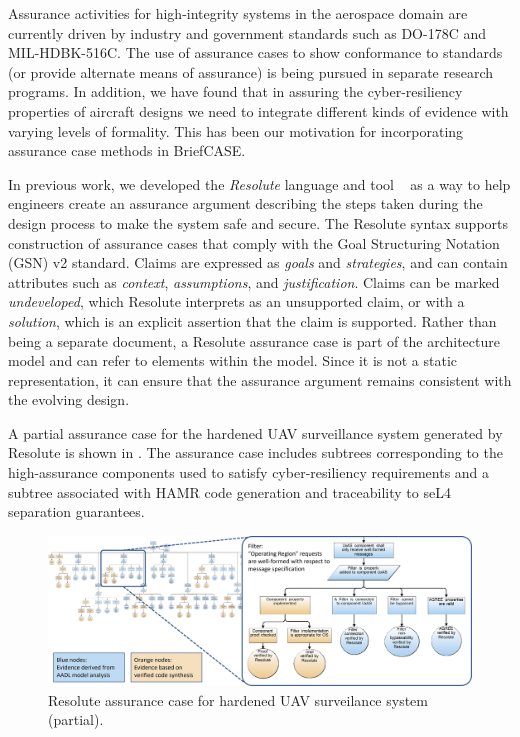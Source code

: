 Assurance activities for high-integrity systems in the aerospace domain are currently driven 
by industry and government standards such as DO-178C and MIL-HDBK-516C.  The use of assurance 
cases to show conformance to standards (or provide alternate means of assurance) is being pursued 
in separate research programs.  
In addition, we have found that in assuring the cyber-resiliency properties of aircraft designs we need to integrate
different kinds of evidence with varying levels of formality. This has been our motivation
for incorporating assurance case methods in BriefCASE.

In previous work, we developed the {\em Resolute} language and tool
~\cite{resolute-destion} as a way to help engineers create an assurance
argument describing the steps taken during the design process to make the system safe and secure.
The Resolute syntax supports construction of assurance cases that comply with the Goal Structuring
Notation (GSN) v2 standard.
Claims are expressed as \textit{goals} and
\textit{strategies}, and can contain attributes such as \textit{context}, \textit{assumptions}, and
\textit{justification}. Claims can be marked \textit{undeveloped}, which Resolute interprets as an
unsupported claim, or with a \textit{solution}, which is an explicit assertion that the claim is
supported. Rather than being a separate document, a Resolute assurance case is part of the
architecture model and can refer to elements within the model. Since it is not a static
representation, it can ensure that the assurance argument remains consistent with the evolving
design.  

A partial assurance case for the hardened UAV surveillance system generated by Resolute 
is shown in .  
The assurance case includes subtrees corresponding to the high-assurance components 
used to satisfy cyber-resiliency requirements and a subtree associated
with HAMR code generation and traceability to seL4 separation guarantees.  

\begin{figure} 
\centering 
\includegraphics[width=\textwidth]{figs/assurance-case.jpg}
\caption{Resolute assurance case for hardened UAV surveilance system (partial). 
}
\label{fig:assurance-case} 
\end{figure}

